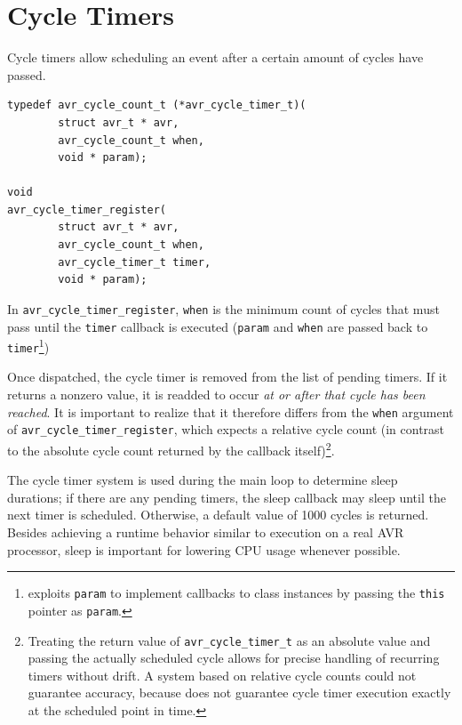 \section{Cycle Timers}

Cycle timers allow scheduling an event after a certain amount of cycles have
passed.

\begin{lstlisting}
typedef avr_cycle_count_t (*avr_cycle_timer_t)(
        struct avr_t * avr,
        avr_cycle_count_t when,
        void * param);

void
avr_cycle_timer_register(
        struct avr_t * avr,
        avr_cycle_count_t when,
        avr_cycle_timer_t timer,
        void * param);
\end{lstlisting}

In \lstinline|avr_cycle_timer_register|,
\lstinline|when| is the minimum count of cycles that must pass until the
\lstinline|timer| callback is executed (\lstinline|param| and \lstinline|when|
are passed back to \lstinline|timer|\footnote{
\qsimavr exploits \lstinline|param| to implement
callbacks to class instances by passing the \lstinline|this| pointer as
\lstinline|param|.})

Once dispatched, the cycle timer is removed from the list of pending timers. If
it returns a nonzero value, it is readded to occur \emph{at or after that cycle has
been reached}. It is important to realize that it therefore differs from the
\lstinline|when| argument of \lstinline|avr_cycle_timer_register|, which expects
a relative cycle count (in contrast to the absolute cycle count returned by the
callback itself)\footnote{
%
Treating the return value of \lstinline|avr_cycle_timer_t| as an absolute value
and passing the actually scheduled cycle allows for precise handling of recurring
timers without drift. A system based on relative cycle counts could not guarantee
accuracy, because \simavr does not guarantee cycle timer execution exactly at the
scheduled point in time.
}.

The cycle timer system is used during the main loop to determine sleep durations;
if there are any pending timers, the sleep callback may sleep until the next timer
is scheduled. Otherwise, a default value of 1000 cycles is returned.
Besides achieving a runtime behavior similar to execution on a real \ac{AVR}
processor, sleep is important for lowering \simavr \ac{CPU} usage whenever possible.

